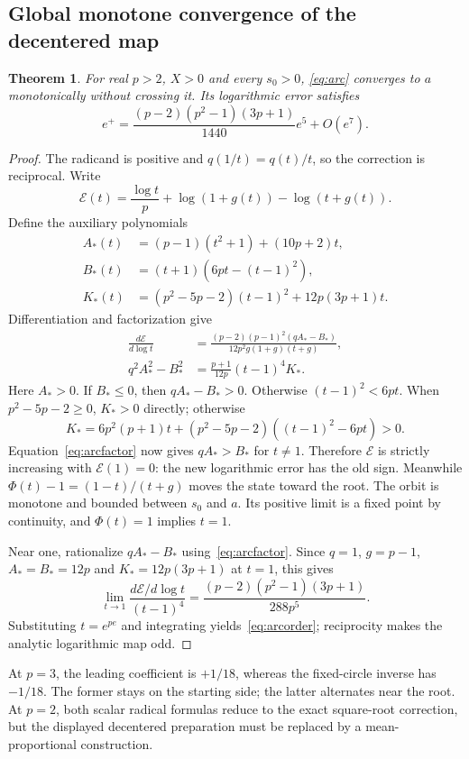 \documentclass[11pt,a4paper]{article}
\newtheorem{theorem}{Theorem}[section]\newtheorem{proposition}[theorem]{Proposition}
\begin{document}
\subsection{Global monotone convergence of the decentered map}
\begin{theorem}\label{thm:arc}
For real $p>2$, $X>0$ and every $s_0>0$, \eqref{eq:arc} converges to $a$ monotonically without crossing it. Its logarithmic error satisfies
\begin{equation}\label{eq:arcorder}
 e^+=\frac{(p-2)(p^2-1)(3p+1)}{1440}e^5+O(e^7).
\end{equation}
\end{theorem}
\begin{proof}
The radicand is positive and $q(1/t)=q(t)/t$, so the correction is reciprocal. Write
\[
 \mathcal E(t)=\frac{\log t}{p}+\log(1+g(t))-\log(t+g(t)).
\]
Define the auxiliary polynomials
\begin{align*}
 A_*(t)&=(p-1)(t^2+1)+(10p+2)t,\\
 B_*(t)&=(t+1)(6pt-(t-1)^2),\\
 K_*(t)&=(p^2-5p-2)(t-1)^2+12p(3p+1)t.
\end{align*}
Differentiation and factorization give
\begin{align}
 \frac{d\mathcal E}{d\log t}
 &=\frac{(p-2)(p-1)^2(qA_*-B_*)}{12p^2g(1+g)(t+g)},\label{eq:arcder}\\
 q^2A_*^2-B_*^2&=\frac{p+1}{12p}(t-1)^4K_* .\label{eq:arcfactor}
\end{align}
Here $A_*>0$. If $B_*\le0$, then $qA_*-B_*>0$. Otherwise $(t-1)^2<6pt$. When $p^2-5p-2\ge0$, $K_*>0$ directly; otherwise
\[
 K_*=6p^2(p+1)t+(p^2-5p-2)((t-1)^2-6pt)>0.
\]
Equation~\eqref{eq:arcfactor} now gives $qA_*>B_*$ for $t\ne1$. Therefore $\mathcal E$ is strictly increasing with $\mathcal E(1)=0$: the new logarithmic error has the old sign. Meanwhile $\Phi(t)-1=(1-t)/(t+g)$ moves the state toward the root. The orbit is monotone and bounded between $s_0$ and $a$. Its positive limit is a fixed point by continuity, and $\Phi(t)=1$ implies $t=1$.

Near one, rationalize $qA_*-B_*$ using~\eqref{eq:arcfactor}. Since $q=1$, $g=p-1$, $A_*=B_*=12p$ and $K_*=12p(3p+1)$ at $t=1$, this gives
\[
 \lim_{t\to1}\frac{d\mathcal E/d\log t}{(t-1)^4}
 =\frac{(p-2)(p^2-1)(3p+1)}{288p^5}.
\]
Substituting $t=e^{pe}$ and integrating yields~\eqref{eq:arcorder}; reciprocity makes the analytic logarithmic map odd.
\end{proof}
At $p=3$, the leading coefficient is $+1/18$, whereas the fixed-circle inverse has $-1/18$. The former stays on the starting side; the latter alternates near the root. At $p=2$, both scalar radical formulas reduce to the exact square-root correction, but the displayed decentered preparation must be replaced by a mean-proportional construction.
\end{document}

